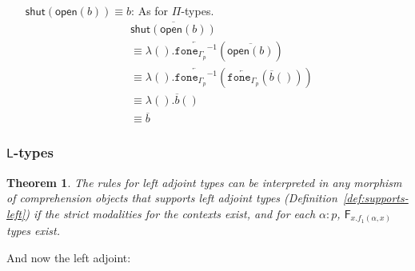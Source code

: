 \documentclass[10pt]{article}
\newtheorem{theorem}{Theorem}
\theoremstyle{definition}
\newcommand{\rewrite}[2]{\overleftarrow{#1}(#2)}
\newcommand\UE[2]{\ensuremath{#1(#2)}}
\newcommand\UI[2]{\ensuremath{\lambda #1.#2}}
\newcommand{\modeof}[1]{{#1}_p}
\newcommand{\upstairs}[1]{\overline{#1}}
\newcommand\fone[1]{\ensuremath{\mathtt{fone}_{#1}}}
\newcommand\foneinv[1]{\ensuremath{\fone{#1}^{-1}}}
\newcommand{\RI}[1]{\mathsf{shut}({#1})}
\newcommand{\RE}[1]{\mathsf{open}({#1})}
\begin{document}
\begin{enumerate}
\item[{$\RI{\RE{b}} \equiv b$}:] As for $\Pi$-types.
\begin{align*}
&\upstairs{\RI{\RE{b}}} \\
&\equiv \UI{()}{\rewrite{\foneinv{\modeof{\Gamma}}}{\upstairs{\RE{b}}}} \\
&\equiv \UI{()}{\rewrite{\foneinv{\modeof{\Gamma}}}{\rewrite{\fone{\modeof{\Gamma}}}{\UE{\upstairs{b}}{}}}} \\
&\equiv \UI{()}{\UE{\upstairs{b}}{}} \\
&\equiv \upstairs{b}
\end{align*}
\end{enumerate}

\subsubsection{$\mathsf{L}$-types}

\begin{theorem}
  The rules for left adjoint types can be interpreted in any morphism of
  comprehension objects that supports left adjoint types
  (Definition~\ref{def:supports-left}) if the strict modalities for the
  contexts exist, and for each $\alpha : p$,
  $\mathsf{F}_{x.f_1(\alpha,x)}$ types exist.
\end{theorem}

And now the left adjoint:
\end{document}

